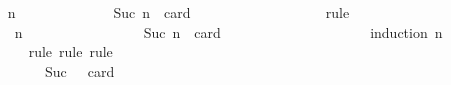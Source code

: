 \begin{isabellebody}
\ \ \ \ \ \ \isamarkupfalse%
\ {\isachardoublequoteopen}{\isasymforall}\ n{\isachardot}\ {\isasymforall}\ {\isasymsigma}\ {\isasymin}\ {\isasymSigma}{\isachardot}\ {\isasymforall}\ {\isasymsigma}{\isacharprime}\ {\isasymin}\ {\isasymSigma}{\isachardot}\ {\isasymnot}\ {\isasymsigma}\ {\isasymsubseteq}\ {\isasymsigma}{\isacharprime}\ {\isasymand}\ Suc\ n\ {\isacharequal}\ card\ {\isacharparenleft}{\isasymsigma}\ {\isacharminus}\ {\isasymsigma}{\isacharprime}{\isacharparenright}{\isasymlongrightarrow}\ \ {\isasymsigma}\ {\isasymunion}\ {\isasymsigma}{\isacharprime}\ {\isasymin}\ {\isasymSigma}{\isachardoublequoteclose}\isanewline
\ \ \ \ \ \ \ \ \isamarkupfalse%
\ {\isacharparenleft}rule{\isacharparenright}\isanewline
\ \ \ \ \ \ \isamarkupfalse%
\ {\isacharminus}\ \isanewline
\ \ \ \ \ \ \ \ \isamarkupfalse%
\ n\isanewline
\ \ \ \ \ \ \ \ \isamarkupfalse%
\ {\isachardoublequoteopen}{\isasymforall}{\isasymsigma}{\isasymin}{\isasymSigma}{\isachardot}\ {\isasymforall}{\isasymsigma}{\isacharprime}{\isasymin}{\isasymSigma}{\isachardot}\ {\isasymnot}\ {\isasymsigma}\ {\isasymsubseteq}\ {\isasymsigma}{\isacharprime}\ {\isasymand}\ Suc\ n\ {\isacharequal}\ card\ {\isacharparenleft}{\isasymsigma}\ {\isacharminus}\ {\isasymsigma}{\isacharprime}{\isacharparenright}\ {\isasymlongrightarrow}\ {\isasymsigma}\ {\isasymunion}\ {\isasymsigma}{\isacharprime}\ {\isasymin}\ {\isasymSigma}{\isachardoublequoteclose}\isanewline
\ \ \ \ \ \ \ \ \ \ \isamarkupfalse%
\ {\isacharparenleft}induction\ n{\isacharparenright}\isanewline
\ \ \ \ \ \ \ \ \ \ \isamarkupfalse%
\ {\isacharparenleft}rule{\isacharcomma}\ rule{\isacharcomma}\ rule{\isacharparenright}\isanewline
\ \ \ \ \ \ \ \ \isamarkupfalse%
\ {\isacharminus}\ \isanewline
\ \ \ \ \ \ \ \ \ \ \isamarkupfalse%
\ {\isasymsigma}\ {\isasymsigma}{\isacharprime}\isanewline
\ \ \ \ \ \ \ \ \ \ \isamarkupfalse%
\ {\isachardoublequoteopen}{\isasymsigma}\ {\isasymin}\ {\isasymSigma}{\isachardoublequoteclose}\ \ {\isachardoublequoteopen}{\isasymsigma}{\isacharprime}\ {\isasymin}\ {\isasymSigma}{\isachardoublequoteclose}\ \ {\isachardoublequoteopen}{\isasymnot}\ {\isasymsigma}\ {\isasymsubseteq}\ {\isasymsigma}{\isacharprime}\ {\isasymand}\ Suc\ {}\ {\isacharequal}\ card\ {\isacharparenleft}{\isasymsigma}\ {\isacharminus}\ {\isasymsigma}{\isacharprime}{\isacharparenright}{\isachardoublequoteclose}\ \isanewline
\ \ \ \ \ \ \ \ \ \ \isamarkupfalse%

\end{isabellebody}
